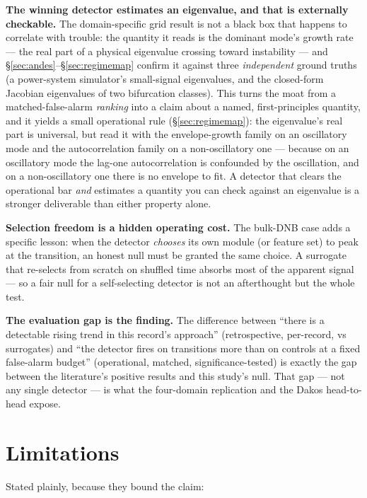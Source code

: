\documentclass[11pt]{article}
\begin{document}
\textbf{The winning detector estimates an eigenvalue, and that is
externally checkable.} The domain-specific grid result is not a black
box that happens to correlate with trouble: the quantity it reads is the
dominant mode's growth rate --- the real part of a physical eigenvalue
crossing toward instability --- and
\S\ref{sec:andes}--\S\ref{sec:regimemap} confirm it against three
\emph{independent} ground truths (a power-system simulator's
small-signal eigenvalues, and the closed-form Jacobian eigenvalues of
two bifurcation classes). This turns the moat from a
matched-false-alarm \emph{ranking} into a claim about a named,
first-principles quantity, and it yields a small operational rule
(\S\ref{sec:regimemap}): the eigenvalue's real part is universal, but
read it with the envelope-growth family on an oscillatory mode and the
autocorrelation family on a non-oscillatory one --- because on an
oscillatory mode the lag-one autocorrelation is confounded by the
oscillation, and on a non-oscillatory one there is no envelope to fit. A
detector that clears the operational bar \emph{and} estimates a quantity
you can check against an eigenvalue is a stronger deliverable than
either property alone.

\textbf{Selection freedom is a hidden operating cost.} The bulk-DNB case
adds a specific lesson: when the detector \emph{chooses} its own module
(or feature set) to peak at the transition, an honest null must be
granted the same choice. A surrogate that re-selects from scratch on
shuffled time absorbs most of the apparent signal --- so a fair null for
a self-selecting detector is not an afterthought but the whole test.

\textbf{The evaluation gap is the finding.} The difference between
``there is a detectable rising trend in this record's approach''
(retrospective, per-record, vs surrogates) and ``the detector fires on
transitions more than on controls at a fixed false-alarm budget''
(operational, matched, significance-tested) is exactly the gap between
the literature's positive results and this study's null. That gap ---
not any single detector --- is what the four-domain replication and the
Dakos head-to-head expose.

\section{Limitations}\label{sec:limitations}

Stated plainly, because they bound the claim:
\end{document}
